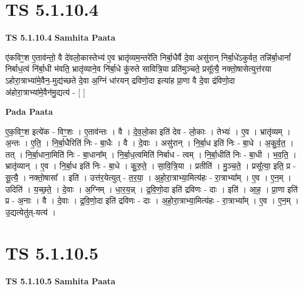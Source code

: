 \documentclass[17pt]{extarticle}
\begin{document}
\section*{ TS 5.1.10.4 }

\textbf{TS 5.1.10.4 } \newline
\textbf{Samhita Paata} \newline

ए॑कविꣳ॒॒श ए॒ताव॑न्तो॒ वै दे॑वलो॒कास्तेभ्य॑ ए॒व भ्रातृ॑व्यम॒न्तरे॑ति निर्बा॒धैर्वै दे॒वा असु॑रान् निर्बा॒धे॑ऽकुर्वत॒ तन्नि॑र्बा॒धानां᳚ निर्बाध॒त्वं नि॑र्बा॒धी भ॑वति॒ भ्रातृ॑व्याने॒व नि॑र्बा॒धे कु॑रुते सावित्रि॒या प्रति॑मुञ्चते॒ प्रसू᳚त्यै॒ नक्तो॒षासेत्युत्त॑रया ऽहोरा॒त्राभ्या॑मे॒वैन॒-मुद्य॑च्छते दे॒वा अ॒ग्निं धा॑रयन् द्रविणो॒दा इत्या॑ह प्रा॒णा वै दे॒वा द्र॑विणो॒दा अ॑होरा॒त्राभ्या॑मे॒वैन॑मु॒द्यत्य॑ - [  ] \newline

\textbf{Pada Paata} \newline

ए॒क॒विꣳ॒॒श इत्ये॑क - विꣳ॒॒शः । ए॒ताव॑न्तः । वै । दे॒व॒लो॒का इति॑ देव - लो॒काः । तेभ्यः॑ । ए॒व । भ्रातृ॑व्यम् । अ॒न्तः । ए॒ति॒ । नि॒र्बा॒धैरिति॑ निः - बा॒धैः । वै । दे॒वाः । असु॑रान् । नि॒र्बा॒ध इति॑ निः - बा॒धे । अ॒कु॒र्व॒त॒ । तत् । नि॒र्बा॒धाना॒मिति॑ निः - बा॒धाना᳚म् । नि॒र्बा॒ध॒त्वमिति॑ निर्बाध - त्वम् । नि॒र्बा॒धीति॑ निः - बा॒धी । भ॒व॒ति॒ । भ्रातृ॑व्यान् । ए॒व । नि॒र्बा॒ध इति॑ निः - बा॒धे । कु॒रु॒ते॒ । सा॒वि॒त्रि॒या । प्रतीति॑ । मु॒ञ्च॒ते॒ । प्रसू᳚त्या॒ इति॒ प्र - सू॒त्यै॒ । नक्तो॒षासा᳚ । इति॑ । उत्त॑र॒येत्युत् - त॒र॒या॒ । अ॒हो॒रा॒त्राभ्या॒मित्य॑हः - रा॒त्राभ्या᳚म् । ए॒व । ए॒न॒म् । उदिति॑ । य॒च्छ॒ते॒ । दे॒वाः । अ॒ग्निम् । धा॒र॒य॒न्न् । द्र॒वि॒णो॒दा इति॑ द्रविणः - दाः । इति॑ । आ॒ह॒ । प्रा॒णा इति॑ प्र - अ॒नाः । वै । दे॒वाः । द्र॒वि॒णो॒दा इति॑ द्रविणः - दाः । अ॒हो॒रा॒त्राभ्या॒मित्य॑हः - रा॒त्राभ्या᳚म् । ए॒व । ए॒न॒म् । उ॒द्यत्येतु॑त्-यत्य॑ ।  \newline




\section*{ TS 5.1.10.5 }

\textbf{TS 5.1.10.5 } \newline
\textbf{Samhita Paata} \newline
\end{document}
